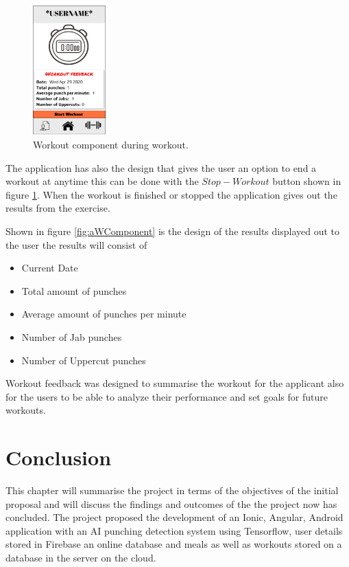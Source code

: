 \documentclass[a4paper,12pt]{report}
\begin{document}
\begin{figure}
\centering
\includegraphics[width=0.25\textwidth]{images/afterWorkout.png}
\caption{\label{fig:ipWComponent}Workout component during workout.}
\end{figure}




The application has also the design that gives the user an option to end a workout at anytime this can be done with the $Stop-Workout$ button shown in figure \ref{fig:ipWComponent}.
When the workout is finished or stopped the application gives out the results from the exercise.

Shown in figure \ref{fig:aWComponent} is the design of the results displayed out to the user the results will consist of 
\begin{itemize}
    \item Current Date 
    \item Total amount of punches
    \item Average amount of punches per minute
    \item Number of Jab punches
    \item Number of Uppercut punches
\end{itemize}
Workout feedback was designed to summarise the workout for the applicant also for the users to be able to analyze their performance and set goals for future workouts. 




\chapter{Conclusion}
This chapter will summarise the project in terms of the objectives of
the initial proposal and will discuss the findings and outcomes of the
the project now has concluded.
The project proposed the development of an Ionic, Angular, Android application
with an AI punching detection system using Tensorflow, user details stored in Firebase an online
database and meals as well as workouts stored on a database in the server on the cloud.
\end{document}
